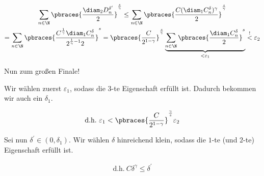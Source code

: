 \begin{solution}
\begin{enumerate}[label = \arabic*.]
    \begin{multline*}
        \sum_{n \in \N}
            \pbraces
            {
                \frac{\diam_2 D_n^{\delta^\prime}}{2}
            }^\frac{s}{\gamma}
        \leq
        \sum_{n \in \N}
            \pbraces
            {
                \frac{C (\diam_1 C_n^\delta)^\gamma}{2}
            }^\frac{s}{\gamma} \\
        =
        \sum_{n \in \N}
            \pbraces
            {
                \frac
                {
                    C^\frac{1}{\gamma}
                    \diam_1 C_n^\delta
                }{
                    2^{\frac{1}{\gamma} - 1}
                    2
                }
            }^s
        =
        \pbraces
        {
            \frac{C}
            {
                2^{1 - \gamma}
            }    
        }^\frac{s}{\gamma}
        \underbrace
        {
            \sum_{n \in \N}
            \pbraces
            {
                \frac{\diam_1 C_n^\delta}{2}
            }^s
        }_{< \varepsilon_1}
        \stackrel{!}{<}
        \varepsilon_2
    \end{multline*}

\end{enumerate}

Nun zum großen Finale!

Wir wählen zuerst $\varepsilon_1$, sodass die $3$-te Eigenschaft erfüllt ist.
Dadurch bekommen wir auch ein $\delta_1$.

\begin{align*}
    \text{d.h.}~
    \varepsilon_1
    <
    \pbraces
    {
        \frac{C}
        {
            2^{1 - \gamma}
        }
    }^\frac{\gamma}{s}
    \varepsilon_2
\end{align*}

Sei nun $\delta^\prime \in (0, \delta_1)$.
Wir wählen $\delta$ hinreichend klein, sodass die $1$-te (und $2$-te) Eigenschaft erfüllt ist.

\begin{align*}
    \text{d.h.}~
    C \delta^\gamma
    \leq
    \delta^\prime
\end{align*}

\end{solution}

